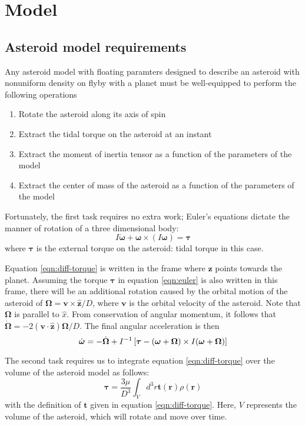 \documentclass[aps,twocolumn,secnumarabic,balancelastpage,amsmath,amssymb,nofootinbib,floatfix]{revtex4-1}
\begin{document}
\section{Model}
\subsection{Asteroid model requirements}
\label{sec:requirements}
Any asteroid model with floating paramters designed to describe an asteroid with nonuniform density on flyby with a planet must be well-equipped to perform the following operations

\begin{enumerate}
    \item Rotate the asteroid along its axis of spin
    \item Extract the tidal torque on the asteroid at an instant
    \item Extract the moment of inertia tensor as a function of the parameters of the model
    \item Extract the center of mass of the asteroid as a function of the parameters of the model
\end{enumerate}
Fortunately, the first task requires no extra work; Euler's equations dictate the manner of rotation of a three dimensional body:
\begin{equation}
    I\dot{\bm{\omega}} + \bm \omega \times (I \bm \omega) = \bm \tau
    \label{eqn:euler}
\end{equation}
where $\bm \tau$ is the external torque on the asteroid: tidal torque in this case.

Equation \ref{eqn:diff-torque} is written in the frame where $\hat {\bm z}$ points towards the planet. Assuming the torque $\bm \tau$ in equation \ref{eqn:euler} is also written in this frame, there will be an additional rotation caused by the orbital motion of the asteroid of $\bm \Omega = \bm v \times \hat{\bm z} / D$, where $\bm v$ is the orbital velocity of the asteroid. Note that $\bm \Omega$ is parallel to $\hat x$. From conservation of angular momentum, it follows that $\dot{\bm \Omega} = -2(\bm v \cdot \hat{\bm z})\bm \Omega / D$. The final angular acceleration is then
\begin{equation}
    \dot{\bm \omega} = -\dot{\bm \Omega} + I^{-1}\left[ \bm \tau - (\bm \omega + \bm \Omega) \times I(\bm \omega + \bm \Omega) \right]
    \label{eqn:angular-acc}
\end{equation}

The second task requires us to integrate equation \ref{eqn:diff-torque} over the volume of the asteroid model as follows:
\begin{equation}
    \bm{\tau} =  \frac{3\mu}{D^3}\int_{V} d^3 r \bm{t}(\bm{r}) \rho(\bm r) 
    \label{eqn:total-torque}
\end{equation}
with the definition of $\bm{t}$ given in equation \ref{eqn:diff-torque}. Here, $V$ represents the volume of the asteroid, which will rotate and move over time.
\end{document}
